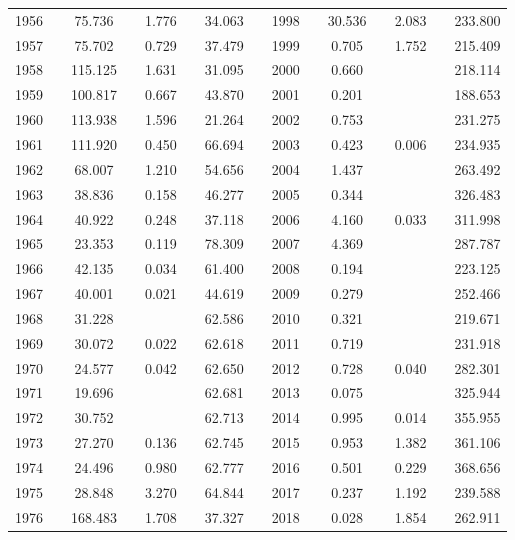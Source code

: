 \begin{table}[]
\begin{tabular}{clccccccclccccc}
1956 &  & 75.736 &  & 1.776 &  & 34.063 &  & 1998 &  & 30.536 &  & 2.083 &  & 233.800 \\
1957 &  & 75.702 &  & 0.729 &  & 37.479 &  & 1999 &  & 0.705 &  & 1.752 &  & 215.409 \\
1958 &  & 115.125 &  & 1.631 &  & 31.095 &  & 2000 &  & 0.660 &  &  &  & 218.114 \\
1959 &  & 100.817 &  & 0.667 &  & 43.870 &  & 2001 &  & 0.201 &  &  &  & 188.653 \\
1960 &  & 113.938 &  & 1.596 &  & 21.264 &  & 2002 &  & 0.753 &  &  &  & 231.275 \\
1961 &  & 111.920 &  & 0.450 &  & 66.694 &  & 2003 &  & 0.423 &  & 0.006 &  & 234.935 \\
1962 &  & 68.007 &  & 1.210 &  & 54.656 &  & 2004 &  & 1.437 &  &  &  & 263.492 \\
1963 &  & 38.836 &  & 0.158 &  & 46.277 &  & 2005 &  & 0.344 &  &  &  & 326.483 \\
1964 &  & 40.922 &  & 0.248 &  & 37.118 &  & 2006 &  & 4.160 &  & 0.033 &  & 311.998 \\
1965 &  & 23.353 &  & 0.119 &  & 78.309 &  & 2007 &  & 4.369 &  &  &  & 287.787 \\
1966 &  & 42.135 &  & 0.034 &  & 61.400 &  & 2008 &  & 0.194 &  &  &  & 223.125 \\
1967 &  & 40.001 &  & 0.021 &  & 44.619 &  & 2009 &  & 0.279 &  &  &  & 252.466 \\
1968 &  & 31.228 &  &  &  & 62.586 &  & 2010 &  & 0.321 &  &  &  & 219.671 \\
1969 &  & 30.072 &  & 0.022 &  & 62.618 &  & 2011 &  & 0.719 &  &  &  & 231.918 \\
1970 &  & 24.577 &  & 0.042 &  & 62.650 &  & 2012 &  & 0.728 &  & 0.040 &  & 282.301 \\
1971 &  & 19.696 &  &  &  & 62.681 &  & 2013 &  & 0.075 &  &  &  & 325.944 \\
1972 &  & 30.752 &  &  &  & 62.713 &  & 2014 &  & 0.995 &  & 0.014 &  & 355.955 \\
1973 &  & 27.270 &  & 0.136 &  & 62.745 &  & 2015 &  & 0.953 &  & 1.382 &  & 361.106 \\
1974 &  & 24.496 &  & 0.980 &  & 62.777 &  & 2016 &  & 0.501 &  & 0.229 &  & 368.656 \\
1975 &  & 28.848 &  & 3.270 &  & 64.844 &  & 2017 &  & 0.237 &  & 1.192 &  & 239.588 \\
1976 &  & 168.483 &  & 1.708 &  & 37.327 &  & 2018 &  & 0.028 &  & 1.854 &  & 262.911 \\

\end{tabular}
\end{table}
